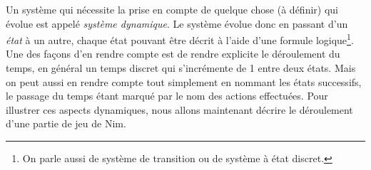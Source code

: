 Un système qui nécessite la prise en compte de quelque chose (à définir) qui évolue est appelé \emph{système dynamique}. Le système évolue donc en passant d'un \emph{état} à un autre, chaque état pouvant être décrit à l'aide d'une formule logique\footnote{On parle aussi de système de transition ou de système à état discret.}. Une des façons d'en rendre compte est de rendre explicite le déroulement du temps, en général un temps discret qui s'incrémente de 1 entre deux états. Mais on peut aussi en rendre compte tout simplement en nommant les états successifs, le passage du temps étant marqué par le nom des actions effectuées.
Pour illustrer ces aspects dynamiques, nous allons maintenant décrire le déroulement d'une partie de jeu de Nim.


